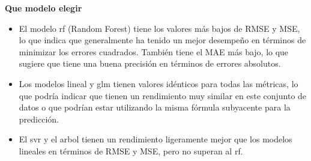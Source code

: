 \documentclass[
  11pt,
  bookmarksnumbered]{article}
\begin{document}
\begin{table}[H]

\caption{\label{tab:unnamed-chunk-31}Base de Datos de prueba mensual}
\centering
{}
\end{table}

\textbf{Que modelo elegir}

\begin{itemize}
\item
  El modelo rf (Random Forest) tiene los valores más bajos de RMSE y MSE, lo que indica que generalmente ha tenido un mejor desempeño en términos de minimizar los errores cuadrados.
  También tiene el MAE más bajo, lo que sugiere que tiene una buena precisión en términos de errores absolutos.
\item
  Los modelos lineal y glm tienen valores idénticos para todas las métricas, lo que podría indicar que tienen un rendimiento muy similar en este conjunto de datos o que podrían estar utilizando la misma fórmula subyacente para la predicción.
\item
  El svr y el arbol tienen un rendimiento ligeramente mejor que los modelos lineales en términos de RMSE y MSE, pero no superan al rf.
\end{itemize}
\end{document}
